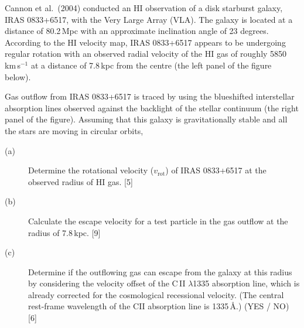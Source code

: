 Cannon et al.\ (2004) conducted an HI observation of a disk starburst galaxy,
IRAS 0833+6517, with the Very Large Array (VLA). The galaxy is located at a
distance of 80.2\,Mpc with an approximate inclination angle of 23 degrees.
According to the HI velocity map, IRAS 0833+6517 appears to be undergoing
regular rotation with an observed radial velocity of the HI gas of roughly
5850\,km\,s$^{-1}$ at a distance of 7.8\,kpc from the centre (the left panel
of the figure below).

Gas outflow from IRAS 0833+6517 is traced by using the blueshifted
interstellar absorption lines observed against the backlight of the stellar
continuum (the right panel of the figure). Assuming that this galaxy is
gravitationally stable and all the stars are moving in circular orbits,

\begin{description}
\item[(a)] Determine the rotational velocity ($v_{\mathrm{rot}}$) of IRAS
  0833+6517 at the observed radius of HI gas. \hfill[5]
\item[(b)] Calculate the escape velocity for a test particle in the gas
  outflow at the radius of 7.8\,kpc. \hfill[9]
\item[(c)] Determine if the outflowing gas can escape from the galaxy at this
  radius by considering the velocity offset of the C\,II $\lambda$1335
  absorption line, which is already corrected for the cosmological recessional
  velocity. (The central rest-frame wavelength of the CII absorption line is
  1335\,\AA.) (YES / NO) \hfill[6]
\end{description}
